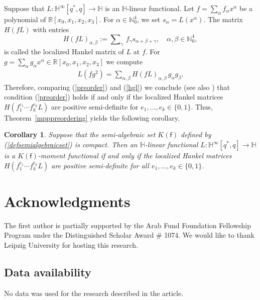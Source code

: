 \documentclass[11pt,a4paper]{amsart}
\newtheorem{corollary}[theorem]{Corollary}
\theoremstyle{definition}
\begin{document}
Suppose that $L: \mathbb{H}^{\infty}[q^{*}, q] \to \mathbb{H}$ is an
$\mathbb{H}$-linear functional. Let
$f=\sum _{\alpha }f_{\alpha }x^{\alpha}$ be a polynomial of
$ \mathbb{R}[x_{0},x_{1},x_{2},x_{3}]$. For
$\alpha \in \mathbb{N}_{0}^{4}$, we set
$s_{\alpha }= L(x^{\alpha}) $. The matrix $H(fL)$ with entries
%
\begin{equation}
H(fL)_{\alpha ,\beta}:=\sum \nolimits _{\gamma }\, f_{\gamma }s_{
\alpha + \beta +\gamma},\quad \alpha , \beta \in \mathbb{N}_{0}^{4},
\label{eq67}
\end{equation}
%
is called the localized Hankel matrix of $L$ at $f$. For
$ g=\sum \nolimits _{\alpha }g_{\alpha }x^{\alpha}\in \mathbb{R}[x_{0},x_{1},x_{2},x_{3}]$
we compute
%
\begin{align}
\label{hgl}
L(fg^{2})=\sum \nolimits _{\alpha , \beta} H(fL)_{\alpha ,\beta}\, g_{
\alpha }g_{\beta}.
\end{align}
%
Therefore, comparing (\ref{preorder}) and (\ref{hgl}) we conclude (see
also \cite[Proposition 12.14]{Schmudgen2017}) that condition (\ref{preorder})
holds if and only if the localized Hankel matrices
$H(f_{1}^{e_{1}}\cdots f_{k}^{e_{k}}L)$ are positive semi-definite for
$e_{1},\dots ,e_{k}\in \{0,1\}$. Thus, Theorem~\ref{mpppreordering} yields
the following corollary.
%
\begin{corollary}
\label{cor7.3}
Suppose that the semi-algebraic set $K({\mathsf{f}})$ defined by (\ref{defsemialgebraicset})
is compact. Then an $\mathbb{H}$-linear functional
$L:\mathbb{H}^{\infty}[q^{*}, q]\to \mathbb{H}$ is a $K({\mathsf{f}})$-moment
functional if and only if the localized Hankel matrices
$H(f_{1}^{e_{1}}\cdots f_{k}^{e_{k}}L)$ are positive semi-definite for
all $ e_{1},\dots ,e_{k}\in \{0,1\}$.
\end{corollary}


\section*{Acknowledgments}
The first author is partially supported by the Arab Fund Foundation Fellowship Program under the Distinguished Scholar Award \# 1074. We would like to thank Leipzig University for hosting this research.

\subsection*{Data availability}
No data was used for the research described in the article.
\end{document}
